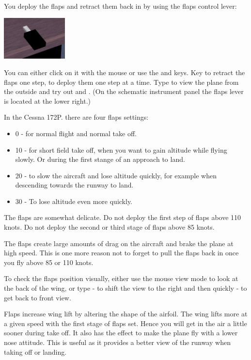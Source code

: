 \begin{itemize}
You deploy the flaps and retract them back in by using the
flaps control lever:


\begin{center}
\includegraphics[width=0.25\textwidth]{img/tut_34}
\end{center}

You can either click on it with the mouse or use the \key{[} and
\key{]} keys. Key \key{[} to retract the flaps one step, \key{]} to
deploy them one step at a time. Type  to view the plane from the outside
and try out \key{[} and \key{]}. (On the schematic instrument panel the
flaps lever is located at the lower right.)

In the Cessna 172P. there are four flaps settings:
\begin{itemize}
    \item 0\textdegree{} - for normal flight and normal take off.
    \item 10\textdegree{} - for short field take off, when you want to gain altitude while
  flying slowly. Or during the first stange of an approach to land.
    \item 20\textdegree{} - to slow the aircraft and lose altitude quickly, for example
  when descending towards the runway to land.
    \item 30\textdegree{} - To lose altitude even more quickly.
\end{itemize}

The flaps are somewhat delicate. Do not deploy the first step of flaps above
110 knots. Do not deploy the second or third stage of flaps above 85 knots.

The flaps create large amounts of drag on the aircraft and brake the plane at
high speed. This is one more reason not to forget to pull the flaps back in
once you fly above 85 or 110 knots.

To check the flaps position visually, either use the mouse view mode to look
at the back of the wing, or type - to shift the
view to the right and then quickly - to get back to front view.

Flaps increase wing lift by altering the shape of the airfoil. The wing lifts
more at a given speed with the first stage of flaps set. Hence you will get in
the air a little sooner during take off. It also has the effect to make the
plane fly with a lower nose attitude. This is useful as it provides a better
view of the runway when taking off or landing.


\end{itemize}
